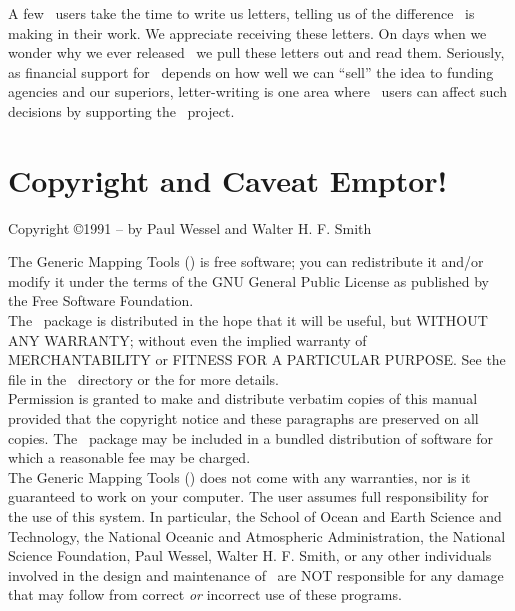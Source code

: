 A few \GMT\ users take the time to write us letters, telling us of the
difference \GMT\ is making in their work.  We appreciate receiving these
letters.  On days when we wonder why we ever released \GMT\ we pull
these letters out and read them.  Seriously, as financial support for
\GMT\ depends on how well we can ``sell'' the idea to funding agencies and
our superiors, letter-writing is one area where \GMT\ users can affect
such decisions by supporting the \GMT\ project. 


\chapter*{Copyright and Caveat Emptor!}

\begin{center}
Copyright \copyright 1991 -- \GMTDOCYEAR by Paul Wessel and Walter H. F. Smith
\end{center}

\vspace{\baselineskip}

The Generic Mapping Tools (\GMT) is free software; you can redistribute
it and/or modify it under the terms of the GNU General Public License
as published by the Free Software Foundation. \\

The \GMT\ package is distributed in the hope that it will be useful, but
WITHOUT ANY WARRANTY; without even the implied warranty of
MERCHANTABILITY or FITNESS FOR A PARTICULAR PURPOSE.  See the
file  in the \GMT\ directory or the
for more details. \\

Permission is granted to make and distribute verbatim copies of this
manual provided that the copyright notice and these paragraphs are
preserved on all copies.  The \GMT\ package may be included in a bundled
distribution of software for which a reasonable fee may be charged. \\

The Generic Mapping Tools (\GMT) does not come with any warranties,
nor is it guaranteed to work on your computer.  The user assumes full
responsibility for the use of this system. In particular, the School of
Ocean and Earth Science and Technology, the National Oceanic and
Atmospheric Administration, the National Science Foundation,
Paul Wessel, Walter H. F. Smith, or any other individuals involved in
the design and maintenance of \GMT\ are NOT responsible for any damage
that may follow from correct \emph{or} incorrect use of these programs.

